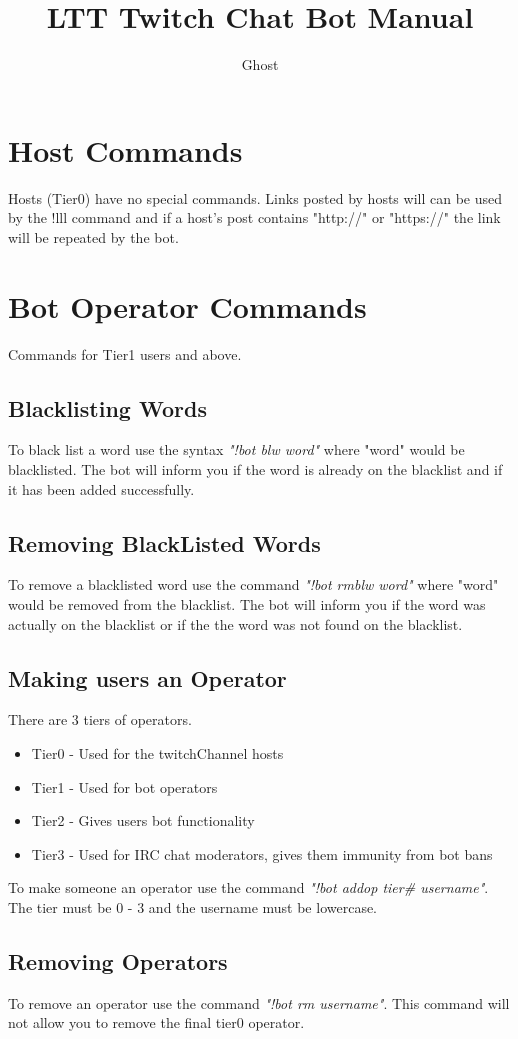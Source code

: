 \documentclass[10pt]{article}
\author{Ghost}
\title{LTT Twitch Chat Bot Manual}
\begin{document}
\maketitle
\tableofcontents
\section{Host Commands}
Hosts (Tier0) have no special commands. Links posted by hosts will can be used by the !lll command and if a host's post contains "http://" or "https://" the link will be repeated by the bot. 
\section{Bot Operator Commands}
Commands for Tier1 users and above.
\subsection{Blacklisting Words}
To black list a word use the syntax \emph{"!bot blw word"} where "word" would be blacklisted. The bot will inform you if the word is already on the blacklist and if it has been added successfully.
\subsection{Removing BlackListed Words}
To remove a blacklisted word use the command \emph{"!bot rmblw word"} where "word" would be removed from the blacklist. The bot will inform you if the word was actually on the blacklist or if the the word was not found on the blacklist.
\subsection{Making users an Operator}
There are 3 tiers of operators.
\begin{itemize}
\item {Tier0 - Used for the twitchChannel hosts}
\item {Tier1 - Used for bot operators}
\item {Tier2 - Gives users bot functionality}
\item {Tier3 - Used for IRC chat moderators, gives them immunity from bot bans}
\end{itemize}
To make someone an operator use the command \emph{"!bot addop tier\# username"}. The tier must be 0 - 3 and the username must be lowercase.
\subsection{Removing Operators}
To remove an operator use the command \emph{"!bot rm username"}. This command will not allow you to remove the final tier0 operator.
\end{document}
